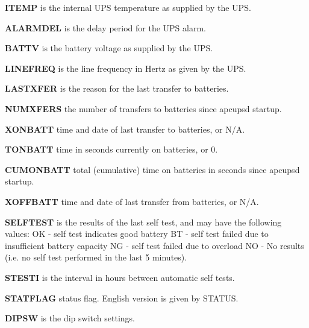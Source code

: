 {{{{{{{{{{{{{{{\begin{description}
\item {\bf ITEMP}
is the internal UPS temperature as supplied by the UPS.  

\item {\bf ALARMDEL}
is the delay period for the UPS alarm.  

\item {\bf BATTV}
is the battery voltage as supplied by the UPS.  

\item {\bf LINEFREQ}
is the line frequency in Hertz as given by the UPS.  

\item {\bf LASTXFER}
is the reason for the last transfer to batteries.  

\item {\bf NUMXFERS}
the number of transfers to batteries since apcupsd startup.  

\item {\bf XONBATT}
time and date of last transfer to batteries, or N/A.  

\item {\bf TONBATT}
time in seconds currently on batteries, or 0.  

\item {\bf CUMONBATT}
total (cumulative) time on batteries in seconds since apcupsd startup.  

\item {\bf XOFFBATT}
time and date of last transfer from batteries, or N/A.  

\item {\bf SELFTEST}
is the results of the last self test, and may have the following values: OK -
self test indicates good battery BT - self test failed due to insufficient
battery capacity NG - self test failed due to overload NO - No results (i.e.
no self test performed in the last 5 minutes).  

\item {\bf STESTI}
is the interval in hours between automatic self tests.  

\item {\bf STATFLAG}
status flag. English version is given by STATUS.  

\item {\bf DIPSW}
is the dip switch settings.  


\end{description}}}}}}}}}}}}}}}}
